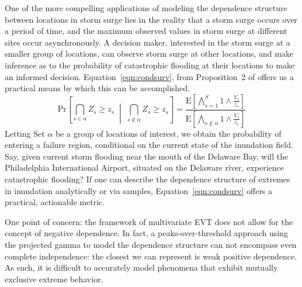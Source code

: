 One of the more compelling applications of modeling the dependence structure between locations in 
    storm surge lies in the reality that a storm surge occurs over a period of time, and the 
    maximum observed values in storm surge at different sites occur asynchronously.  A decision maker,
    interested in the storm surge at a smaller group of locations, can observe storm surge at other
    locations, and make inference as to the probability of catastrophic flooding at their locations
    to make an informed decision.
    Equation~\eqref{eqn:condsurv}, from Proposition~2 of \cite{trubey:pg} offers us a practical means
    by which this can be accomplished.
    \begin{equation}
        \label{eqn:condsurv}
        \text{Pr}\left[\bigcap_{s\in\alpha}Z_s \geq z_s\;\middle|\;\bigcap_{s\not\in\alpha}Z_s \geq z_s\right] =
        \frac{
            \text{E}\left[\bigwedge_{s=1}^S 1\wedge \frac{V_s}{z_s}\right]
        }{
            \text{E}\left[\bigwedge_{s\not\in\alpha} 1\wedge \frac{V_s}{z_s}\right]
        }
    \end{equation}
    Letting Set $\alpha$ be a group of locations of interest, we obtain the probability of
    entering a failure region, conditional on the current state of the inundation field.  
    Say, given current storm flooding near the mouth of the Delaware Bay, will the 
    Philadelphia International Airport, situated on the Delaware river, experience catastrophic flooding?  
    If one can describe the dependence structure of extremes in inundation analytically or via samples,
    Equation~\ref{eqn:condsurv} offers a practical, actionable metric.

    One point of concern: the framework of multivariate EVT does not allow for the concept of negative dependence.  
    In fact, a peaks-over-threshold approach using the projected gamma to model the dependence structure can not
    encompass even complete independence: the closest we can represent is weak positive dependence.
    As such, it is difficult to accurately model phenomena that exhibit mutually exclusive extreme behavior.

    

